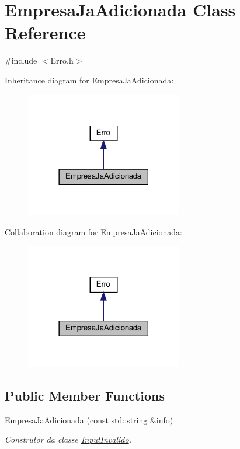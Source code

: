 \hypertarget{classEmpresaJaAdicionada}{}\section{Empresa\+Ja\+Adicionada Class Reference}
\label{classEmpresaJaAdicionada}


{\ttfamily \#include $<$Erro.\+h$>$}



Inheritance diagram for Empresa\+Ja\+Adicionada\+:
\nopagebreak
\begin{figure}[H]
\begin{center}
\leavevmode
\includegraphics[width=194pt]{classEmpresaJaAdicionada__inherit__graph}
\end{center}
\end{figure}


Collaboration diagram for Empresa\+Ja\+Adicionada\+:
\nopagebreak
\begin{figure}[H]
\begin{center}
\leavevmode
\includegraphics[width=194pt]{classEmpresaJaAdicionada__coll__graph}
\end{center}
\end{figure}
\subsection*{Public Member Functions}
\begin{DoxyCompactItemize}
\item 
\hyperlink{classEmpresaJaAdicionada_a31a58cd9fd890fc30edd073a560b1a6e}{Empresa\+Ja\+Adicionada} (const std\+::string \&info)
\begin{DoxyCompactList}\small\item\em Construtor da classe \hyperlink{classInputInvalido}{Input\+Invalido}. \end{DoxyCompactList}\end{DoxyCompactItemize}


